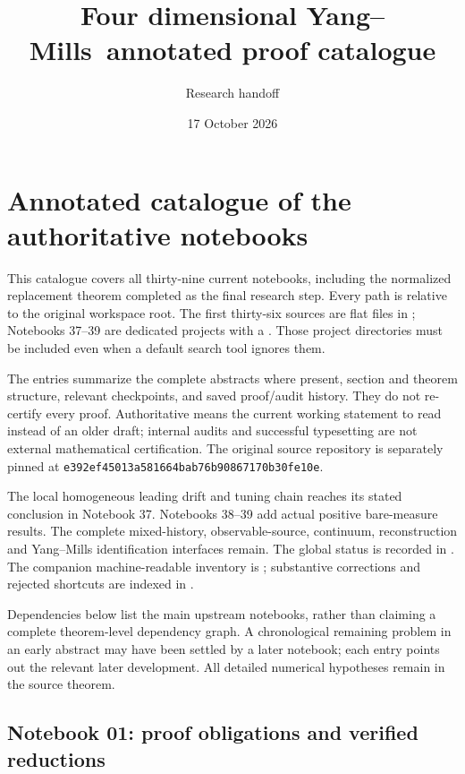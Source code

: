 \documentclass[11pt]{article}
\author{Research handoff}
\date{17 October 2026}
\title{Four dimensional Yang--Mills\ annotated proof catalogue}
\theoremstyle{remark}
\begin{document}
\maketitle
\tableofcontents
\clearpage
\section{Annotated catalogue of the authoritative notebooks}
\label{hnc-catalogue}
This catalogue covers all thirty-nine current notebooks, including
the normalized replacement theorem completed as the final research step.
Every path is relative to the original workspace root. The first
thirty-six sources are flat files in ; Notebooks 37--39
are dedicated projects with a . Those project directories
must be included even when a default search tool ignores them.

The entries summarize the complete abstracts where present, section
and theorem structure, relevant checkpoints, and saved proof/audit
history. They do not re-certify every proof. Authoritative means the
current working statement to read instead of an older draft; internal
audits and successful typesetting are not external mathematical
certification. The original source repository is separately pinned at
\texttt{e392ef45013a581664bab76b90867170b30fe10e}.

The local homogeneous leading drift and tuning chain reaches its
stated conclusion in Notebook 37. Notebooks 38--39 add actual positive
bare-measure results. The complete mixed-history, observable-source,
continuum, reconstruction and Yang--Mills identification interfaces
remain. The global status is recorded in
.
The companion machine-readable inventory is
; substantive corrections
and rejected shortcuts are indexed in
.

Dependencies below list the main upstream notebooks, rather than
claiming a complete theorem-level dependency graph. A chronological
remaining problem in an early abstract may have been settled by a
later notebook; each entry points out the relevant later development.
All detailed numerical hypotheses remain in the source theorem.


\subsection{Notebook 01: proof obligations and verified reductions}
\label{hnc-01}
\noindent{}\par
\end{document}

